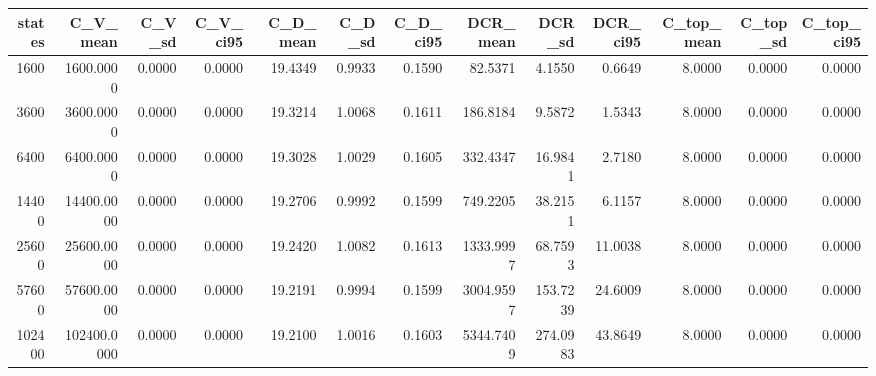 \begin{tabular}{rrrrrrrrrrrrr}
\toprule
states & C_V_mean & C_V_sd & C_V_ci95 & C_D_mean & C_D_sd & C_D_ci95 & DCR_mean & DCR_sd & DCR_ci95 & C_top_mean & C_top_sd & C_top_ci95 \\
\midrule
1600 & 1600.0000 & 0.0000 & 0.0000 & 19.4349 & 0.9933 & 0.1590 & 82.5371 & 4.1550 & 0.6649 & 8.0000 & 0.0000 & 0.0000 \\
3600 & 3600.0000 & 0.0000 & 0.0000 & 19.3214 & 1.0068 & 0.1611 & 186.8184 & 9.5872 & 1.5343 & 8.0000 & 0.0000 & 0.0000 \\
6400 & 6400.0000 & 0.0000 & 0.0000 & 19.3028 & 1.0029 & 0.1605 & 332.4347 & 16.9841 & 2.7180 & 8.0000 & 0.0000 & 0.0000 \\
14400 & 14400.0000 & 0.0000 & 0.0000 & 19.2706 & 0.9992 & 0.1599 & 749.2205 & 38.2151 & 6.1157 & 8.0000 & 0.0000 & 0.0000 \\
25600 & 25600.0000 & 0.0000 & 0.0000 & 19.2420 & 1.0082 & 0.1613 & 1333.9997 & 68.7593 & 11.0038 & 8.0000 & 0.0000 & 0.0000 \\
57600 & 57600.0000 & 0.0000 & 0.0000 & 19.2191 & 0.9994 & 0.1599 & 3004.9597 & 153.7239 & 24.6009 & 8.0000 & 0.0000 & 0.0000 \\
102400 & 102400.0000 & 0.0000 & 0.0000 & 19.2100 & 1.0016 & 0.1603 & 5344.7409 & 274.0983 & 43.8649 & 8.0000 & 0.0000 & 0.0000 \\
\bottomrule
\end{tabular}
